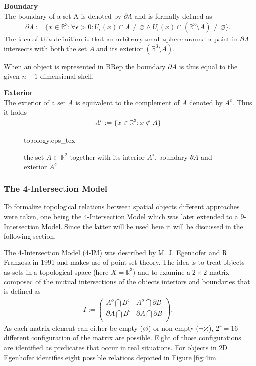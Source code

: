 \documentclass[paper=a4, fontsize=11pt]{scrartcl} %
\numberwithin{equation}{section} %
\numberwithin{figure}{section} %
\numberwithin{table}{section} %
\begin{document}
\textbf{Boundary} \\
The boundary of a set A is denoted by $\partial A$ and is formally defined as
\begin{align*}
  \partial A := \{ x \in \mathbb{R}^3 : \forall \epsilon > 0 : U_{\epsilon}(x) \cap A \ne \varnothing \wedge U_{\epsilon}(x) \cap (\mathbb{R}^3 \setminus A) \ne \varnothing    \}.
\end{align*}
The idea of this definition is that an arbitrary small sphere around a point in $\partial A$ intersects with both the set $A$ and its exterior $(\mathbb{R}^3 \setminus A)$.

When an object is represented in BRep the boundary $\partial A$ is thus equal to the given $n-1$ dimensional shell.  

\textbf{Exterior} \\
The exterior of a set $A$ is equivalent to the complement of $A$ denoted by $A^c$. Thus it holds
\begin{align*}
  A^c:=\{x\in \mathbb{R}^3:x\notin A\}
\end{align*}

\begin{figure}
  \centering
  \def\svgwidth{15em}
  {topology.eps_tex}
  \caption{the set $A \subset \mathbb{R}^2$ together with its interior $A^{\circ}$, boundary $\partial A$ and exterior $A^c$}
  \label{fig:mbr}
\end{figure}

\subsubsection{The 4-Intersection Model}\label{sec:4-intersection-model}
To formalize topological relations between spatial objects different approaches were taken, one being the 4-Intersection Model which was later extended to a 9-Intersection Model. Since the latter will be used here it will be discussed in the following section.

The 4-Intersection Model (4-IM) was described by M. J. Egenhofer and R. Franzosa in 1991 \cite{Egenhofer:1991:IJGIS} and makes use of point set theory. The idea is to treat objects as sets in a topological space (here $X = \mathbb{R}^3$) and to examine a $2\times 2$ matrix composed of the mutual intersections of the objects interiors and boundaries that is defined as
\begin{align*}
  I := \begin{pmatrix}
    A^{o} \bigcap B^{o}        & A^{o} \bigcap \partial B  \\
    \partial A \bigcap B^{o}  & \partial A \bigcap \partial B  \\
  \end{pmatrix}.
\end{align*}
As each matrix element can either be empty ($\varnothing$) or non-empty ($\neg\varnothing$), $2^4 = 16$ different configuration of the matrix are possible. Eight of those configurations are identified as predicates that occur in real situations. For objects in 2D Egenhofer identifies eight possible relations depicted in Figure \ref{fig:4im}.
\end{document}
